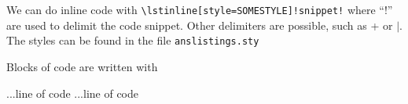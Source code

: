 \documentclass{article}
\begin{document}
We can do inline code with \lstinline[style=latexcode]|\lstinline[style=SOMESTYLE]!snippet!| where ``!'' are used to delimit the code snippet. Other delimiters are possible, such as + or $|$.
The styles can be found in the file \texttt{anslistings.sty}


Blocks of code are written with

\begin{latexcode}
\begin{SOMESTYLE}
...line of code
...line of code
\end{SOMESTYLE}
\end{latexcode}
\end{document}
